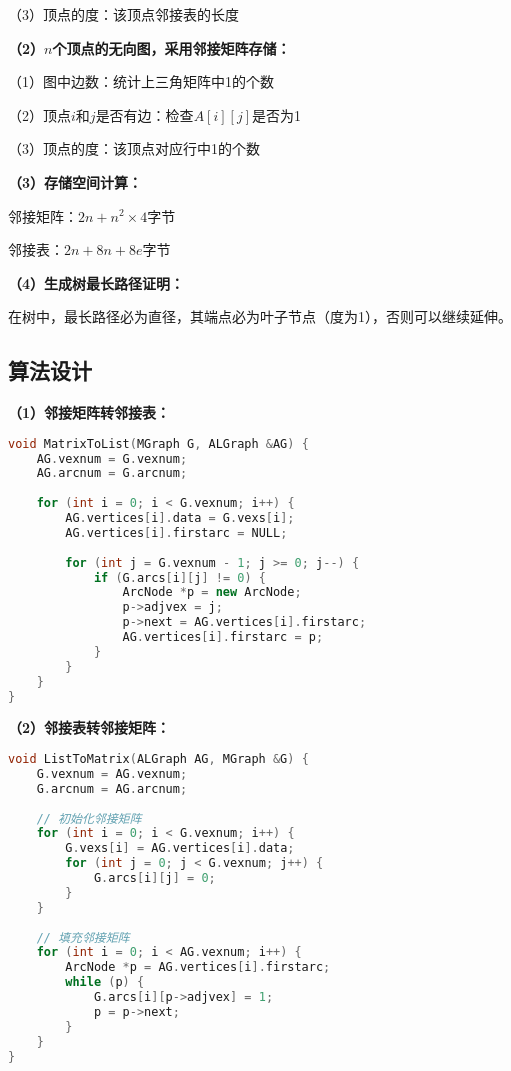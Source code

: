 \documentclass[12pt,a4paper]{amsart}
\begin{document}
（3）顶点的度：该顶点邻接表的长度

\textbf{（2）$n$个顶点的无向图，采用邻接矩阵存储：}

（1）图中边数：统计上三角矩阵中1的个数

（2）顶点$i$和$j$是否有边：检查$A[i][j]$是否为1

（3）顶点的度：该顶点对应行中1的个数

\textbf{（3）存储空间计算：}

邻接矩阵：$2n + n^2 \times 4$字节

邻接表：$2n + 8n + 8e$字节

\textbf{（4）生成树最长路径证明：}

在树中，最长路径必为直径，其端点必为叶子节点（度为1），否则可以继续延伸。

\subsection{算法设计}

\textbf{（1）邻接矩阵转邻接表：}

\begin{lstlisting}[language=C++]
void MatrixToList(MGraph G, ALGraph &AG) {
    AG.vexnum = G.vexnum;
    AG.arcnum = G.arcnum;
    
    for (int i = 0; i < G.vexnum; i++) {
        AG.vertices[i].data = G.vexs[i];
        AG.vertices[i].firstarc = NULL;
        
        for (int j = G.vexnum - 1; j >= 0; j--) {
            if (G.arcs[i][j] != 0) {
                ArcNode *p = new ArcNode;
                p->adjvex = j;
                p->next = AG.vertices[i].firstarc;
                AG.vertices[i].firstarc = p;
            }
        }
    }
}
\end{lstlisting}

\textbf{（2）邻接表转邻接矩阵：}

\begin{lstlisting}[language=C++]
void ListToMatrix(ALGraph AG, MGraph &G) {
    G.vexnum = AG.vexnum;
    G.arcnum = AG.arcnum;
    
    // 初始化邻接矩阵
    for (int i = 0; i < G.vexnum; i++) {
        G.vexs[i] = AG.vertices[i].data;
        for (int j = 0; j < G.vexnum; j++) {
            G.arcs[i][j] = 0;
        }
    }
    
    // 填充邻接矩阵
    for (int i = 0; i < AG.vexnum; i++) {
        ArcNode *p = AG.vertices[i].firstarc;
        while (p) {
            G.arcs[i][p->adjvex] = 1;
            p = p->next;
        }
    }
}
\end{lstlisting}
\end{document}
